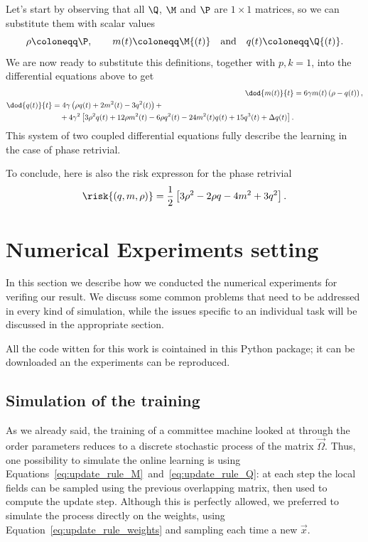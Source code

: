Let's start by observing that all \(\Q\), \(\M\) and \(\P\) are \(1\times 1\) matrices,
so we can substitute them with scalar values
\[\rho \coloneqq \P, \qquad m{(t)}\coloneqq\M{(t)}\quad\text{and}\quad q{(t)}\coloneqq\Q{(t)}.\]
We are now ready to substitute this definitions, together with \(p,k = 1\), into the differential
equations above to get
\begin{subequations}\label{eq:phase_retrivial}\begin{align}
  \dod{m{(t)}}{t} &= 6 \gamma m{(t)} \left(\rho-q{(t)}\right), \\
  \begin{split}
    \dod{q{(t)}}{t} &= 4 \gamma\left(
        \rho q{(t)} + 2m^2{(t)} - 3q^2{(t)}
    \right) +\\
    &\quad+4 \gamma^2 \left[
      3\rho^2q{(t)} + 12\rho m^2{(t)} -6\rho q^2{(t)} -24m^2{(t)}q{(t)} + 15q^3{(t)} + \Delta q{(t)}\right].
  \end{split}
\end{align}\end{subequations}
This system of two coupled differential equations fully describe the learning in the case of phase retrivial.

To conclude, here is also the risk expresson for the phase retrivial
\begin{equation}
  \risk{(q,m,\rho)} = \frac12\left[3\rho^2-2\rho q - 4m^2 + 3q^2\right].
\end{equation}

\section{Numerical Experiments setting}
In this section we describe how we conducted the numerical experiments for verifing 
our result. We discuss some common problems that need to be addressed in every kind of simulation,
while the issues specific to an individual task will be discussed in the appropriate section.

All the code witten for this work is cointained in this Python package;
it can be downloaded an the experiments can be reproduced.

\subsection{Simulation of the training}
As we already said, the training of a committee machine looked at through the order parameters
reduces to a discrete stochastic process of the matrix \(\vec{\Omega}\). Thus, one possibility
to simulate the online learning is using Equations~\eqref{eq:update_rule_M}~and~\eqref{eq:update_rule_Q}:
at each step the local fields can be sampled using the previous overlapping matrix, then
used to compute the update step. Although this is perfectly allowed, we preferred
to simulate the process directly on the weights, using Equation~\eqref{eq:update_rule_weights}
and sampling each time a new \(\vec{x}\).

